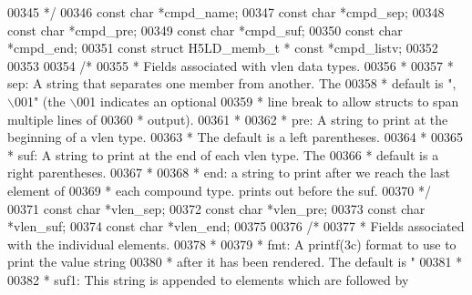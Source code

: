 \begin{DoxyCode}
{{{{{{{{{{{{{{00345 \textcolor{comment}{     */}
00346     \textcolor{keyword}{const} \textcolor{keywordtype}{char}  *cmpd\_name;
00347     \textcolor{keyword}{const} \textcolor{keywordtype}{char}  *cmpd\_sep;
00348     \textcolor{keyword}{const} \textcolor{keywordtype}{char}  *cmpd\_pre;
00349     \textcolor{keyword}{const} \textcolor{keywordtype}{char}  *cmpd\_suf;
00350     \textcolor{keyword}{const} \textcolor{keywordtype}{char}  *cmpd\_end;
00351     \textcolor{keyword}{const} \textcolor{keyword}{struct }H5LD\_memb\_t * \textcolor{keyword}{const} *cmpd\_listv;
00352 
00353 
00354     \textcolor{comment}{/*}
00355 \textcolor{comment}{     * Fields associated with vlen data types.}
00356 \textcolor{comment}{     *}
00357 \textcolor{comment}{     *   sep:       A string that separates one member from another.  The}
00358 \textcolor{comment}{     *              default is ", \(\backslash\)001" (the \(\backslash\)001 indicates an optional}
00359 \textcolor{comment}{     *              line break to allow structs to span multiple lines of}
00360 \textcolor{comment}{     *              output).}
00361 \textcolor{comment}{     *}
00362 \textcolor{comment}{     *   pre:       A string to print at the beginning of a vlen type.}
00363 \textcolor{comment}{     *              The default is a left parentheses.}
00364 \textcolor{comment}{     *}
00365 \textcolor{comment}{     *   suf:       A string to print at the end of each vlen type.  The}
00366 \textcolor{comment}{     *              default is a right parentheses.}
00367 \textcolor{comment}{     *}
00368 \textcolor{comment}{     *   end:       a string to print after we reach the last element of}
00369 \textcolor{comment}{     *              each compound type. prints out before the suf.}
00370 \textcolor{comment}{     */}
00371     \textcolor{keyword}{const} \textcolor{keywordtype}{char}  *vlen\_sep;
00372     \textcolor{keyword}{const} \textcolor{keywordtype}{char}  *vlen\_pre;
00373     \textcolor{keyword}{const} \textcolor{keywordtype}{char}  *vlen\_suf;
00374     \textcolor{keyword}{const} \textcolor{keywordtype}{char}  *vlen\_end;
00375 
00376     \textcolor{comment}{/*}
00377 \textcolor{comment}{     * Fields associated with the individual elements.}
00378 \textcolor{comment}{     *}
00379 \textcolor{comment}{     *   fmt:       A printf(3c) format to use to print the value string}
00380 \textcolor{comment}{     *              after it has been rendered.  The default is "%
00381 \textcolor{comment}{     *}
00382 \textcolor{comment}{     *   suf1:      This string is appended to elements which are followed by}
}}}}}}}}}}}}}}}
\end{DoxyCode}
